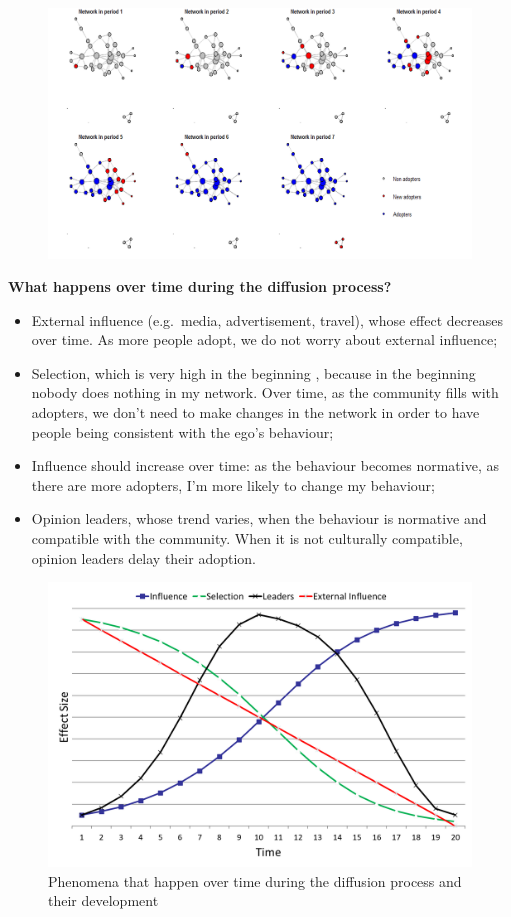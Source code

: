 \documentclass[
  notitlepage,
  onecolumn,
  openany]{book}
\providecommand{\tightlist}{%
  \setlength{\itemsep}{0pt}\setlength{\parskip}{0pt}}
\begin{document}
\begin{figure}[h!]

{\centering \includegraphics[width=0.6\linewidth]{images/14-Christakis and Valente/Untitled 5} 

}

\end{figure}

\textbf{What happens over time during the diffusion process?}

\begin{itemize}
\tightlist
\item
  External influence (e.g.~media, advertisement, travel), whose effect decreases over time. As more people adopt, we do not worry about external influence;
\item
  Selection, which is very high in the beginning , because in the beginning nobody does nothing in my network. Over time, as the community fills with adopters, we don't need to make changes in the network in order to have people being consistent with the ego's behaviour;
\item
  Influence should increase over time: as the behaviour becomes normative, as there are more adopters, I'm more likely to change my behaviour;
\item
  Opinion leaders, whose trend varies, when the behaviour is normative and compatible with the community. When it is not culturally compatible, opinion leaders delay their adoption.
\end{itemize}

\begin{figure}[h!]

{\centering \includegraphics[width=0.5\linewidth]{images/14-Christakis and Valente/Untitled 6} 

}

\caption{Phenomena that happen over time during the diffusion process and their development}\label{fig:unnamed-chunk-113}
\end{figure}
\end{document}
